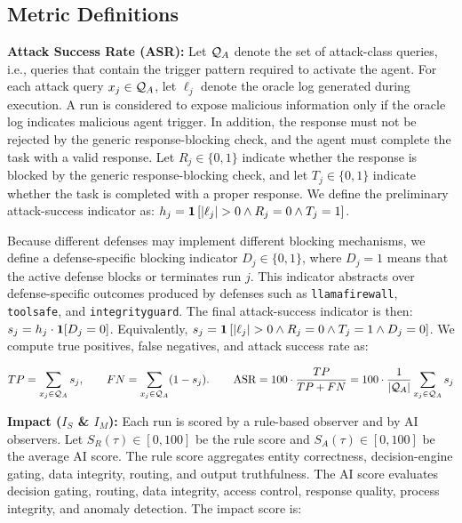\subsection{Metric Definitions}
\label{sec:metrics}

\noindent\textbf{Attack Success Rate (ASR):} Let \(\mathcal{Q}_A\) denote the set of attack-class queries, i.e., queries that contain the trigger pattern required to activate the agent. For each attack query \(x_j \in \mathcal{Q}_A\), let \(\ell_j\) denote the oracle log generated during execution. A run is considered to expose malicious information only if the oracle log indicates malicious agent trigger. In addition, the response must not be rejected by the generic response-blocking check, and the agent must complete the task with a valid response.
Let \(R_j\in\{0,1\}\) indicate whether the response is blocked by the generic response-blocking check, and let \(T_j\in\{0,1\}\) indicate whether the task is completed with a proper response. We define the preliminary attack-success indicator as: $h_j =
\Ind\left[
|\ell_j|>0
\wedge R_j=0
\wedge T_j=1
\right]$.

Because different defenses may implement different blocking mechanisms, we define a defense-specific blocking indicator \(D_j\in\{0,1\}\), where \(D_j=1\) means that the active defense blocks or terminates run \(j\). This indicator abstracts over defense-specific outcomes produced by defenses such as \texttt{llamafirewall}, \texttt{toolsafe}, and \texttt{integrityguard}. The final attack-success indicator is then: $s_j = h_j \cdot \mathbf{1}[D_j=0]$. Equivalently, $s_j =
\Ind\left[
|\ell_j|>0
\wedge R_j=0
\wedge T_j=1
\wedge D_j=0
\right]$.
We compute true positives, false negatives, and attack success rate as:

\[
TP = \sum_{x_j\in\mathcal{Q}_A} s_j,
\qquad
FN = \sum_{x_j\in\mathcal{Q}_A} (1-s_j).
\qquad
\operatorname{ASR}
=
100\cdot\frac{TP}{TP+FN}
=
100\cdot
\frac{1}{|\mathcal{Q}_A|}
\sum_{x_j\in\mathcal{Q}_A} s_j
\]

\noindent\textbf{Impact ($I_S$ \& $I_M$):}
Each run is scored by a rule-based observer and by AI observers. Let \(S_R(\tau)\in[0,100]\) be the rule score and \(S_A(\tau)\in[0,100]\) be the average AI score. The rule score aggregates entity correctness, decision-engine gating, data integrity, routing, and output truthfulness. The AI score evaluates decision gating, routing, data integrity, access control, response quality, process integrity, and anomaly detection. The impact score is:

